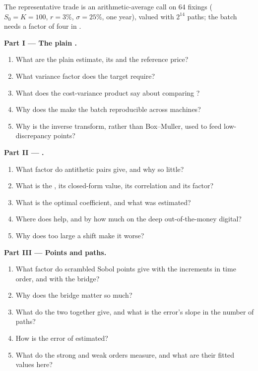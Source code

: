 \begin{problem}\label{pb:qm:monte-carlo:1}
The representative trade is an arithmetic-average call on 64 fixings ($S_0 = K = 100$, $r = 3\%$, $\sigma = 25\%$, one year), valued with $2^{14}$ paths; the batch needs a factor of four in .

\medskip\noindent\textbf{Part I --- The plain .}
\begin{enumerate}
\item What are the plain estimate, its  and the reference price?
\item What variance factor does the target require?
\item What does the cost-variance product say about comparing ?
\item Why does the  make the batch reproducible across machines?
\item Why is the inverse transform, rather than Box--Muller, used to feed low-discrepancy points?
\end{enumerate}

\medskip\noindent\textbf{Part II --- .}
\begin{enumerate}[resume]
\item What factor do antithetic pairs give, and why so little?
\item What is the , its closed-form value, its correlation and its factor?
\item What is the optimal coefficient, and what was estimated?
\item Where does  help, and by how much on the deep out-of-the-money digital?
\item Why does too large a shift make it worse?
\end{enumerate}

\medskip\noindent\textbf{Part III --- Points and paths.}
\begin{enumerate}[resume]
\item What factor do scrambled Sobol points give with the increments in time order, and with the bridge?
\item Why does the bridge matter so much?
\item What do the two together give, and what is the error's slope in the number of paths?
\item How is the error of  estimated?
\item What do the strong and weak orders measure, and what are their fitted values here?
\end{enumerate}


\end{problem}
